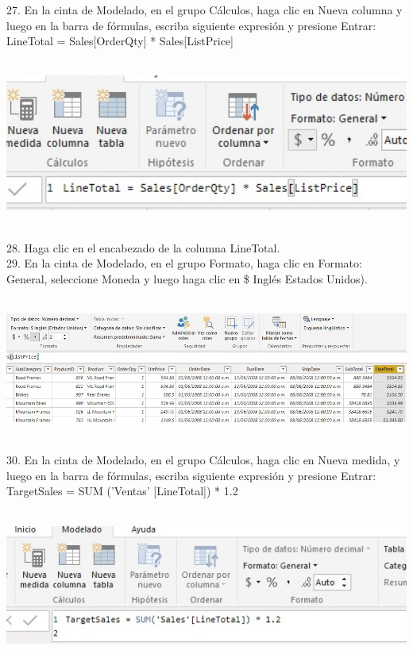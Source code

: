 \documentclass[12pt,letterpaper]{article}
\begin{document}
\begin{flushleft}
\begin{itemize}
27. En la cinta de Modelado, en el grupo Cálculos, haga clic en Nueva columna y luego en la barra de fórmulas, escriba
siguiente expresión y presione Entrar: LineTotal = Sales[OrderQty] * Sales[ListPrice]\\
\textbf{ }\\
\begin{center}
	\includegraphics[width=16cm]{./Imagenes/image23} 
	\end{center}
\textbf{ }\\

28. Haga clic en el encabezado de la columna LineTotal.\\
29. En la cinta de Modelado, en el grupo Formato, haga clic en Formato: General, seleccione Moneda y luego haga clic en \$
Inglés Estados Unidos).\\
\textbf{ }\\
\begin{center}
	\includegraphics[width=16cm]{./Imagenes/image24} 
	\end{center}
\textbf{ }\\

30. En la cinta de Modelado, en el grupo Cálculos, haga clic en Nueva medida, y luego en la barra de fórmulas, escriba
siguiente expresión y presione Entrar:
TargetSales = SUM ('Ventas' [LineTotal]) * 1.2\\
\textbf{ }\\
\begin{center}
	\includegraphics[width=16cm]{./Imagenes/image25} 
	\end{center}
\textbf{ }\\


\end{itemize}
\end{flushleft}
\end{document}
